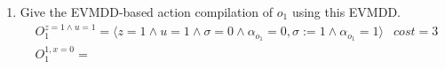 \documentclass[11pt,a4paper]{article}
\begin{document}
\begin{enumerate}[label=\alph*)]
	\item Give the EVMDD-based action compilation of $o_1$ using this EVMDD.
	\begin{align*}
		&O_1^{z=1 \land u=1} = \langle z = 1 \land u = 1 \land \sigma = 0 \land \alpha_{o_1} = 0, \sigma := 1 \land \alpha_{o_1} = 1\rangle & cost=3&\\
		&O_1^{1, x=0} = 
	\end{align*}
\end{enumerate}
\end{document}
